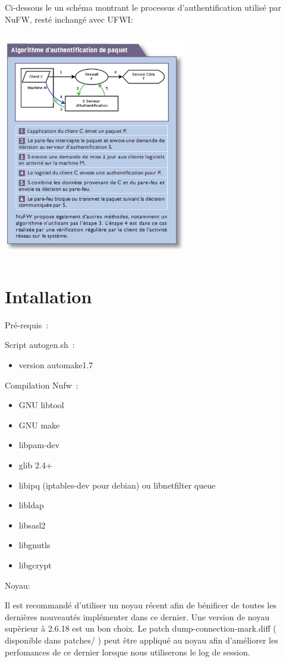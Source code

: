 \documentclass[12pt]{report}
\begin{document}
Ci-dessous le un schéma montrant le processus d'authentification utilisé par NuFW, resté inchangé avec UFWI:

\begin{center}
  \includegraphics[width=8cm,height=10cm]{images/auth.png}
\end{center}

\section{Intallation}

Pré-requis :

Script autogen.sh :
    \begin{itemize}
      \item version automake1.7
    \end{itemize}
Compilation Nufw :
  \begin{itemize}
    \item GNU libtool
    \item GNU make
    \item libpam-dev
    \item glib 2.4+
    \item libipq (iptables-dev pour debian) ou libnetfilter queue
    \item libldap
    \item libsasl2
    \item libgnutls
    \item libgcrypt
  \end{itemize}

Noyau:

Il est recommandé d'utiliser un noyau récent afin de bénificer de toutes les dernières nouveautés implémenter dans ce dernier.
Une version de noyau supèrieur à 2.6.18 est un bon choix. Le patch dump-connection-mark.diff ( disponible dans patches/ ) 
peut être appliqué au noyau afin d'améliorer les perfomances de ce dernier lorsque nous utiliserons le log de session.
\end{document}
